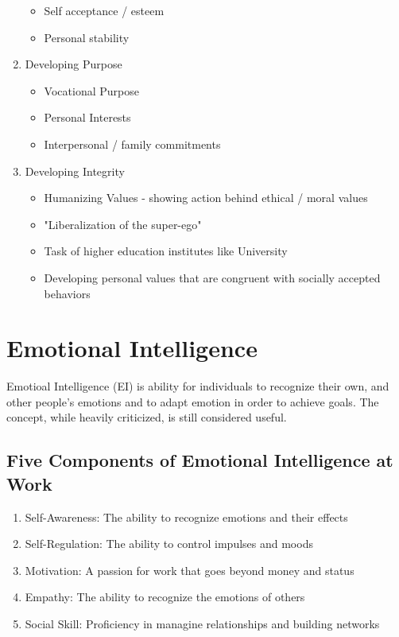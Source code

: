 \documentclass{article}
\begin{document}
\begin{enumerate}
\begin{itemize}
      \item Self acceptance / esteem
      \item Personal stability
    \end{itemize}
  \item Developing Purpose
    \begin{itemize}
      \item Vocational Purpose
      \item Personal Interests
      \item Interpersonal / family commitments
    \end{itemize}
  \item Developing Integrity
    \begin{itemize}
      \item Humanizing Values - showing action behind ethical / moral values
      \item "Liberalization of the super-ego"
      \item Task of higher education institutes like University
      \item Developing personal values that are congruent with socially accepted behaviors
    \end{itemize}
\end{enumerate}

\section{Emotional Intelligence}
Emotioal Intelligence (EI) is ability for individuals to recognize their own, and other people's emotions and to adapt emotion in order to achieve goals. The concept, while heavily criticized, is still considered useful.
\subsection{Five Components of Emotional Intelligence at Work}
\begin{enumerate}
  \item Self-Awareness: The ability to recognize emotions and their effects
  \item Self-Regulation: The ability to control impulses and moods
  \item Motivation: A passion for work that goes beyond money and status
  \item Empathy: The ability to recognize the emotions of others
  \item Social Skill: Proficiency in managine relationships and building networks
\end{enumerate}
\end{document}
